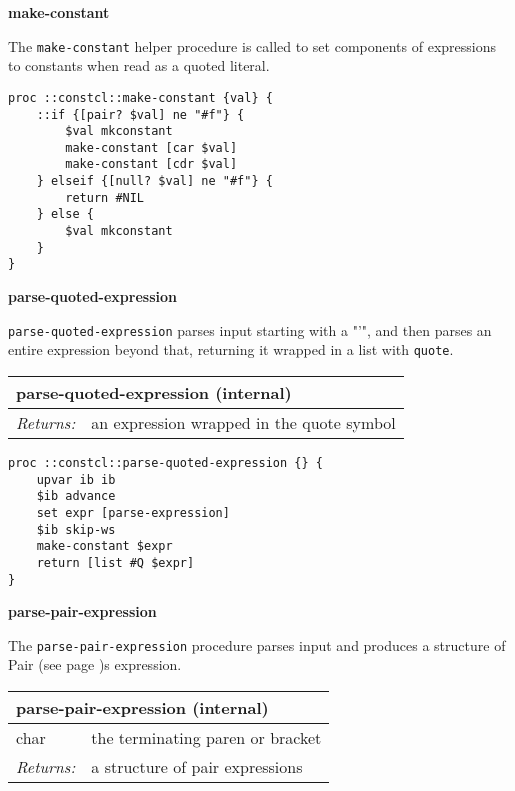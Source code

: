 \documentclass{report}
\begin{document}
\textbf{make-constant}


The \texttt{make-constant} helper procedure is called to set components of expressions to constants when read as a quoted literal.

\noindent\makebox[\linewidth]{\rule{\linewidth}{0.4pt}}
\begin{lstlisting}
proc ::constcl::make-constant {val} {
    ::if {[pair? $val] ne "#f"} {
        $val mkconstant
        make-constant [car $val]
        make-constant [cdr $val]
    } elseif {[null? $val] ne "#f"} {
        return #NIL
    } else {
        $val mkconstant
    }
}
\end{lstlisting}
\noindent\makebox[\linewidth]{\rule{\linewidth}{0.4pt}}

\textbf{parse-quoted-expression}


\texttt{parse-quoted-expression} parses input starting with a "'", and then parses an entire expression beyond that, returning it wrapped in a list with \texttt{quote}.

\begin{tabular}{ |l l| }
\hline
\multicolumn{2}{|l|}{parse-quoted-expression (internal)} \\
\hline
\textit{Returns:} & an expression wrapped in the quote symbol \\
\hline
\end{tabular}

\noindent\makebox[\linewidth]{\rule{\linewidth}{0.4pt}}
\begin{lstlisting}
proc ::constcl::parse-quoted-expression {} {
    upvar ib ib
    $ib advance
    set expr [parse-expression]
    $ib skip-ws
    make-constant $expr
    return [list #Q $expr]
}
\end{lstlisting}
\noindent\makebox[\linewidth]{\rule{\linewidth}{0.4pt}}

\textbf{parse-pair-expression}


The \texttt{parse-pair-expression} procedure parses input and produces a structure of Pair (see page \pageref{pairs-and-lists})s expression.

\begin{tabular}{ |l l| }
\hline
\multicolumn{2}{|l|}{parse-pair-expression (internal)} \\
\hline
char & the terminating paren or bracket \\
\textit{Returns:} & a structure of pair expressions \\
\hline
\end{tabular}
\end{document}

